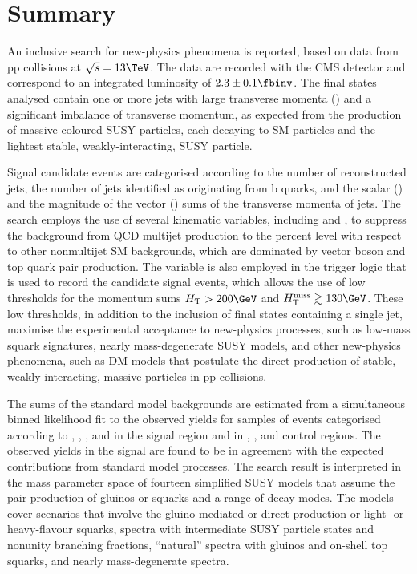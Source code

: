 \section{Summary}
\label{sec:summary}

An inclusive search for new-physics phenomena is reported, based on
data from pp collisions at $\sqrt{s} = 13\TeV$. The data are recorded
with the CMS detector and correspond to an integrated luminosity of
$2.3 \pm 0.1 \fbinv$. The final states analysed contain one or more
jets with large transverse momenta (\Pt) and a significant imbalance
of transverse momentum, as expected from the production of massive
coloured SUSY particles, each decaying to SM particles and the
lightest stable, weakly-interacting, SUSY particle.

Signal candidate events are categorised according to the number of
reconstructed jets, the number of jets identified as originating from
b quarks, and the scalar (\scalht) and the magnitude of the vector
(\HTmiss) sums of the transverse momenta of jets.  The search employs
the use of several kinematic variables, including \alphat and \bdphi,
to suppress the background from QCD multijet production to the percent
level with respect to other nonmultijet SM backgrounds, which are
dominated by vector boson and top quark pair production. The \alphat
variable is also employed in the trigger logic that is used to record
the candidate signal events, which allows the use of low thresholds
for the momentum sums $\scalht > 200\GeV$ and $\HTmiss \gtrsim
130\GeV$. These low thresholds, in addition to the inclusion of final
states containing a single jet, maximise the experimental acceptance
to new-physics processes, such as low-mass squark signatures, nearly
mass-degenerate SUSY models, and other new-physics phenomena, such as
DM models that postulate the direct production of stable, weakly
interacting, massive particles in pp collisions.

The sums of the standard model backgrounds are estimated from a
simultaneous binned likelihood fit to the observed yields for samples
of events categorised according to \njet, \nb, \scalht, and \HTmiss in
the signal region and in \mj, \mmj, and \gj control regions. The
observed yields in the signal are found to be in agreement with the
expected contributions from standard model processes.  The search
result is interpreted in the mass parameter space of fourteen
simplified SUSY models that assume the pair production of
gluinos or squarks and a range of decay modes. The models cover
scenarios that involve the gluino-mediated or direct production or
light- or heavy-flavour squarks, spectra with intermediate SUSY particle
states and nonunity branching fractions, ``natural'' spectra with
gluinos and on-shell top squarks, and nearly mass-degenerate spectra.

